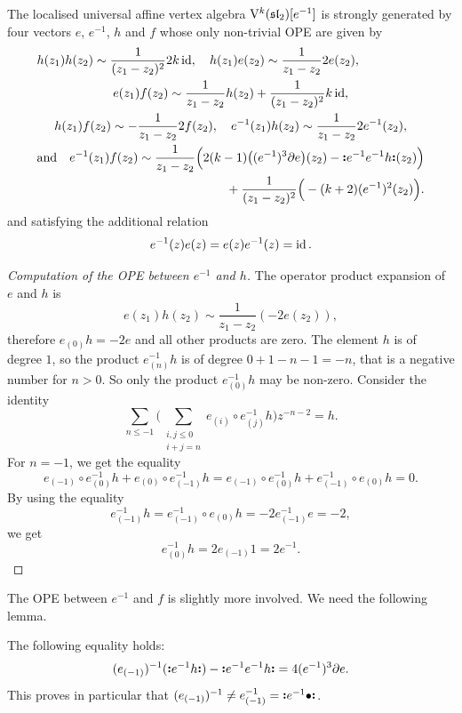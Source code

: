 \begin{proposition} \label{proposition:relations-localisation-sl2}
	The localised universal affine vertex algebra $\mathrm V^k(\mathfrak{sl}_2)[e^{-1}]$ is strongly generated by four vectors $e$, $e^{-1}$, $h$ and $f$ whose only non-trivial OPE are given by
	\[ \begin{multlined}
		h(z_1) h(z_2) \sim \frac{1}{(z_1 - z_2)^2} 2 k \id, \quad h(z_1) e(z_2) \sim \frac{1}{z_1 - z_2} 2 e(z_2) , \\ e(z_1) f(z_2) \sim \frac{1}{z_1 - z_2} h(z_2) + \frac{1}{(z_1 - z_2)^2} k \id, \\
		h(z_1) f(z_2) \sim - \frac{1}{z_1 - z_2} 2 f(z_2),\quad
		e^{-1}(z_1) h(z_2) \sim  \frac{1}{z_1 - z_2} 2 e^{-1}(z_2), \\
		\text{and} \quad e^{-1}(z_1) f(z_2) \sim  \frac{1}{z_1 - z_2} \Big( 2 (k - 1) \big((e^{-1})^3 \partial e\big)(z_2) - \NO{e^{-1} e^{-1} h}(z_2)\Big) \\
		+ \frac{1}{(z_1 - z_2)^2} \Big( - (k + 2) (e^{-1})^2(z_2)\Big).
	\end{multlined} \]
	and satisfying the additional relation
	\[ e^{-1}(z) e(z) = e(z) e^{-1}(z) = \operatorname{id}. \]
\end{proposition}

\begin{proof}[Computation of the OPE between $e^{-1}$ and $h$]
	The operator product expansion of $e$ and $h$ is
	\[ e(z_1) h(z_2) \sim \frac{1}{z_1 - z_2} (- 2 e(z_2)), \]
	therefore $e_{(0)} h = - 2 e$ and all other products are zero. The element $h$ is of degree $1$, so the product $e^{-1}_{(n)} h$ is of degree $0 + 1 - n - 1 = -n$, that is a negative number for $n > 0$. So only the product $e^{-1}_{(0)} h$ may be non-zero. Consider the identity
	\[ \sum_{n \leqslant- 1} \Big(\sum_{\substack{i, j \leqslant 0 \\ i + j = n}} e_{(i)} \circ e^{-1}_{(j)} h \Big) z^{- n -2} = h. \]
	For $n = -1$, we get the equality
	\[ e_{(-1)} \circ e^{-1}_{(0)} h + e_{(0)} \circ e^{-1}_{(-1)} h = e_{(-1)} \circ e^{-1}_{(0)} h +  e^{-1}_{(-1)} \circ e_{(0)} h  = 0. \]
	By using the equality
	\[ e^{-1}_{(-1)} h =  e^{-1}_{(-1)} \circ e_{(0)} h = - 2 e^{-1}_{(-1)} e = - 2 , \]
	we get
	\[ e^{-1}_{(0)} h = 2 e_{(-1)} 1 = 2 e^{-1}. \]
\end{proof}

The OPE between $e^{-1}$ and $f$ is slightly more involved. We need the following lemma.

\begin{lemma} \label{lemma:inverse-no}
	The following equality holds:
	\[ (e_{(-1)})^{-1} (\mathopen{\boldsymbol{\vcentcolon}}e^{-1} h\mathclose{\boldsymbol{\vcentcolon}}) - \mathopen{\boldsymbol{\vcentcolon}}e^{-1} e^{-1} h\mathclose{\boldsymbol{\vcentcolon}} = 4 (e^{-1})^3 \partial e. \]
	This proves in particular that $(e_{(-1)})^{-1} \neq e^{-1}_{(-1)} = \mathopen{\boldsymbol{\vcentcolon}}e^{-1} \bullet\mathclose{\boldsymbol{\vcentcolon}}$.
\end{lemma}

